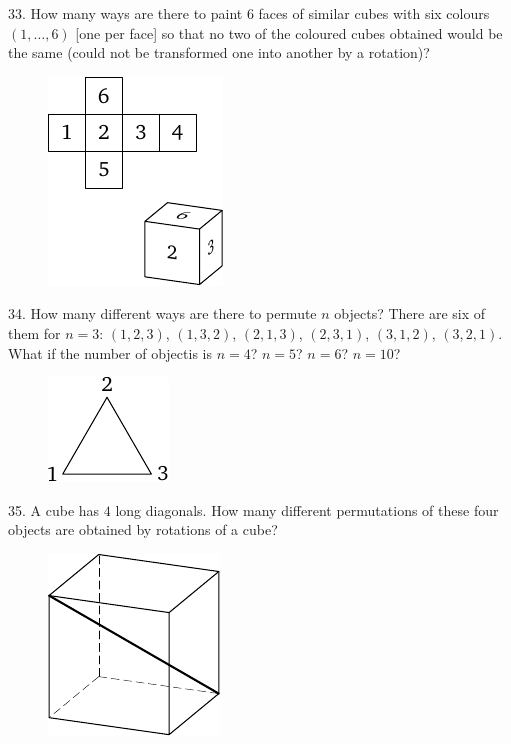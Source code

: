 \begin{problem}{33.}
	How many ways are there to paint $6$ faces of similar cubes with six colours $(1,\dotsc,6)$ [one per face]
	so that no two of the coloured cubes obtained would be the same (could not be transformed one into another
	by a rotation)? 
	\begin{figure}
		\includegraphics{taskbook-17}
	\end{figure}
\end{problem}

\begin{problem}{34.}
	How many different ways are there to permute $n$ objects?
	There are six of them for $n=3$: $(1,2,3)$, $(1,3,2)$, $(2,1,3)$, $(2,3,1)$, $(3,1,2)$, $(3,2,1)$. What if the number of objectis is $n=4$? $n=5$? $n=6$? $n=10$?
	\begin{figure}
		\includegraphics{taskbook-18}
	\end{figure}
\end{problem}

\begin{problem}{35.}
	A cube has $4$ long diagonals. How many different permutations of these four objects are obtained by rotations of a cube?
	\begin{figure}
		\includegraphics{taskbook-19}
	\end{figure}
\end{problem}

